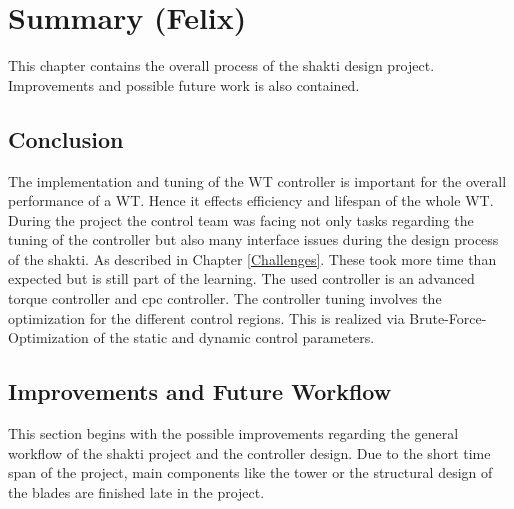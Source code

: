 \chapter{Summary (Felix)}
This chapter contains the overall process of the \gls{shakti} design project.
Improvements and possible future work is also contained.
\section{Conclusion}
The implementation and tuning of the \gls{WT} controller is important for the overall performance of a \gls{WT}. 
Hence it effects efficiency and lifespan of the whole \gls{WT}.
During the project the control team was facing not only tasks regarding the tuning of the controller but also many interface issues during the design process of the \gls{shakti}.
As described in Chapter \ref{Challenges}. 
These took more time than expected but is still part of the learning.
The used controller is an advanced torque controller and \gls{cpc} controller. 
The controller tuning involves the optimization for the different control regions. 
This is realized via Brute-Force-Optimization of the static and dynamic control parameters.       

\section{Improvements and Future Workflow}
This section begins with the possible improvements regarding the general workflow of the \gls{shakti} project and the controller design.
Due to the short time span of the project, main components like the tower or the structural design of the blades are finished late in the project. 
   